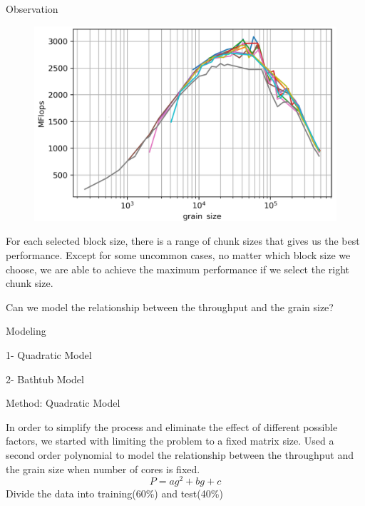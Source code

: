 \documentclass[10pt]{beamer}
\begin{document}
\begin{frame}{Observation}
	\begin{outline}
		\begin{figure}
			\hfill\centering\includegraphics[scale=0.2]{images/fig6_cropped.png}
		\end{figure}
		\1For each selected block size, there is a range of chunk sizes that gives us the best performance. 
		\1Except for some uncommon cases, no matter which block size we choose, we are able to achieve the maximum performance if we select the right chunk size.  
		
		\vspace{\baselineskip}
		Can we model the relationship between the throughput and the grain size?
	\end{outline}
\end{frame}

\begin{frame}{Modeling}
	\begin{outline}
		1- Quadratic Model
		
		
				\vspace{\baselineskip}
		2- Bathtub Model
	\end{outline}
\end{frame}

\begin{frame}{Method: Quadratic Model}
	\begin{outline}
		In order to simplify the process and eliminate the effect of different possible factors, we started with limiting the problem to a fixed matrix size.	
		\1Used a second order polynomial to model the relationship between the throughput and the grain size when number of cores is fixed.
		 $$P=ag^2+bg+c$$    
		 \1Divide the data into training(60\%) and test(40\%)
	\end{outline}
\end{frame}
\end{document}
